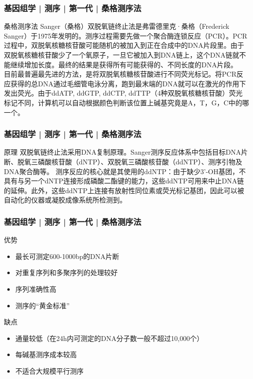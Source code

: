\begin{frame}
  \frametitle{基因组学 | 测序 | 第一代 | 桑格测序法}
  \begin{block}{桑格测序法}
Sanger（桑格）双脱氧链终止法是弗雷德里克·桑格（Frederick Sanger）于1975年发明的。测序过程需要先做一个聚合酶连锁反应（PCR）。PCR过程中，双脱氧核糖核苷酸可能随机的被加入到正在合成中的DNA片段里。由于双脱氧核糖核苷酸少了一个氧原子，一旦它被加入到DNA链上，这个DNA链就不能继续增加长度。最终的结果是获得所有可能获得的、不同长度的DNA片段。\\
\vspace{1em}
目前最普遍最先进的方法，是将双脱氧核糖核苷酸进行不同荧光标记。将PCR反应获得的总DNA通过毛细管电泳分离，跑到最末端的DNA就可以在激光的作用下发出荧光。由于ddATP, ddGTP, ddCTP, ddTTP（4种双脱氧核糖核苷酸）荧光标记不同，计算机可以自动根据颜色判断该位置上碱基究竟是A，T，G，C中的哪一个。 
  \end{block}
\end{frame}

\begin{frame}
  \frametitle{基因组学 | 测序 | 第一代 | 桑格测序法}
  \begin{block}{原理}
双脱氧链终止法采用DNA复制原理。Sanger测序反应体系中包括目标DNA片断、脱氧三磷酸核苷酸（dNTP）、双脱氧三磷酸核苷酸（ddNTP）、测序引物及DNA聚合酶等。 测序反应的核心就是其使用的ddNTP：由于缺少3'-OH基团，不具有与另一个dNTP连接形成磷酸二酯键的能力，这些ddNTP可用来中止DNA链的延伸。此外，这些ddNTP上连接有放射性同位素或荧光标记基团，因此可以被自动化的仪器或凝胶成像系统所检测到。
  \end{block}
\end{frame}

\begin{frame}
  \frametitle{基因组学 | 测序 | 第一代 | 桑格测序法}
  \begin{block}{优势}
    \begin{itemize}
      \item 最长可测定600-1000bp的DNA片断
      \item 对重复序列和多聚序列的处理较好
      \item 序列准确性高
      \item 测序的“黄金标准”
    \end{itemize}
  \end{block}
  \pause
  \begin{block}{缺点}
    \begin{itemize}
      \item 通量较低（在24h内可测定的DNA分子数一般不超过10,000个）
      \item 每碱基测序成本较高
      \item 不适合大规模平行测序
    \end{itemize}
  \end{block}
\end{frame}

